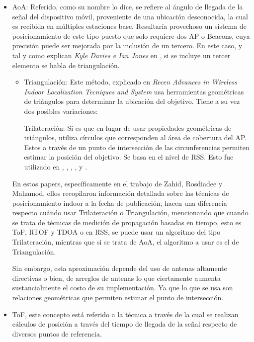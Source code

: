 \begin{itemize}
\item{\ac{AoA}: Referido, como su nombre lo dice, se refiere al ángulo de llegada de la señal del dispositivo móvil, proveniente de una ubicación desconocida, la cual es recibida en múltiples estaciones base. Resultaría provechoso un sistema de posicionamiento de este tipo puesto que solo requiere dos AP o Beacons, cuya precisión puede ser mejorada por la inclusión de un tercero. En este caso, y tal y como explican \textit{Kyle Davies e Ian Jones }en \cite{11}, si se incluye un tercer elemento se habla de triangulación.

\begin{itemize}
\item{Triangulación: Este método, explicado en \textit{Recen Advances in Wireless Indoor Localization Tecniques and System}\cite{6} usa herramientas geométricas de triángulos para determinar la ubicación del objetivo. Tiene a su vez dos posibles variaciones:

Trilateración: Si es que en lugar de usar propiedades geométricas de triángulos, utiliza círculos que corresponden al área de cobertura del AP. Estos a través de un punto de intersección de las circunferencias permiten estimar la posición del objetivo. Se basa en el nivel de RSS. Esto fue utilizado en \cite{3}, \cite{4}, \cite{5}, \cite{7}, \cite{8} y \cite{9}.}
\end{itemize}

En estos papers, específicamente en el trabajo de Zahid, Rosdiadee y Mahamod, ellos recopilaron información detallada sobre las técnicas de posicionamiento indoor a la fecha de publicación, hacen una diferencia respecto cuándo usar Trilateración o Triangulación, mencionando que cuando se trata de técnicas de medición de propagación basadas en tiempo, esto es \ac{ToF}, RTOF y TDOA o en RSS, se puede usar un algoritmo del tipo Trilateración, mientras que si se trata de AoA, el algoritmo a usar es el de Triangulación. 

Sin embargo, esta aproximación depende del uso de antenas altamente directivas o bien, de arreglos de antenas lo que ciertamente aumenta sustancialmente el costo de su implementación. Ya que lo que se usa son relaciones geométricas que permiten estimar el punto de intersección. }

\item{\ac{ToF}, este concepto está referido a la técnica a través de la cual se realizan cálculos de posición a través del tiempo de llegada de la señal respecto de diversos puntos de referencia.}
\end{itemize}


